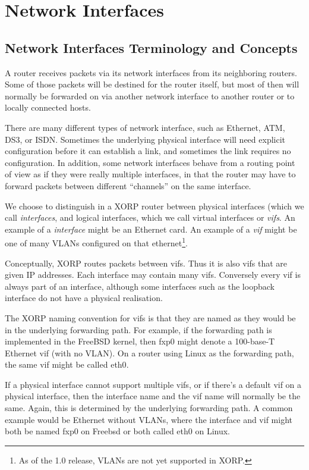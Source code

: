 \chapter{Network Interfaces}
\label{interfaces}
\section{Network Interfaces Terminology and Concepts}

A router receives packets via its network interfaces from its
neighboring routers.  Some of those packets will be destined for the
router itself, but most of then will normally be forwarded on via
another network interface to another router or to locally connected
hosts.

There are many different types of network interface, such as Ethernet,
ATM, DS3, or ISDN.  Sometimes the underlying physical interface will
need explicit configuration before it can establish a link, and
sometimes the link requires no configuration.  In addition, some
network interfaces behave from a routing point of view as if they were
really multiple interfaces, in that the router may have to forward
packets between different ``channels'' on the same interface.  

We choose to distinguish in a XORP router between physical interfaces
(which we call {\it interfaces}, and logical interfaces, which we call
virtual interfaces or {\it vifs}.  An example of a {\it interface}
might be an Ethernet card.  An example of a {\it vif} might be one of
many VLANs configured on that ethernet\footnote{As of the 1.0 release,
VLANs are not yet supported in XORP.}.

Conceptually, XORP routes packets between vifs.  Thus it is also vifs
that are given IP addresses.  Each interface may contain many vifs.
Conversely every vif is always part of an interface, although some
interfaces such as the loopback interface do not have a physical
realisation.

The XORP naming convention for vifs is that they are named as they
would be in the underlying forwarding path.  For example, if the
forwarding path is implemented in the FreeBSD kernel, then {\stt fxp0}
might denote a 100-base-T Ethernet vif (with no VLAN).  On a router
using Linux as the forwarding path, the same vif might be called {\stt
eth0}.  

If a physical interface cannot support multiple vifs, or if there's a
default vif on a physical interface, then the interface name and the
vif name will normally be the same.  Again, this is determined by the
underlying forwarding path.  A common example would be Ethernet
without VLANs, where the interface and vif might both be named {\stt
fxp0} on Freebsd or both called {\stt eth0} on Linux.


